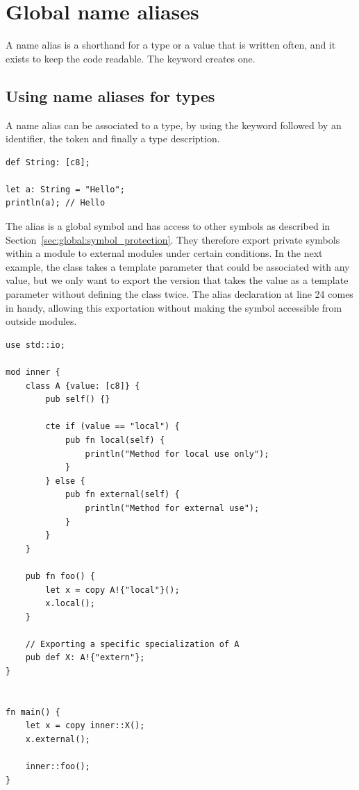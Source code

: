 \section{Global name aliases}
\label{sec:global:global_alias_names}

A name alias is a shorthand for a type or a value that is written often, and it
exists to keep the code readable. The keyword  creates one.

\subsection{Using name aliases for types}

A name alias can be associated to a type, by using the keyword 
followed by an identifier, the token \token{:} and finally a type description.

\begin{lstlisting}[style=coloredverbatim]
def String: [c8];

let a: String = "Hello";
println(a); // Hello
\end{lstlisting}

The alias is a global symbol and has access to other symbols as described in
Section~\ref{sec:global:symbol_protection}. They therefore export
private symbols within a module to external modules under certain conditions. In
the next example, the class  takes a template parameter that could be
associated with any value, but we only want to export the version that takes the
value  as a template parameter without defining the class twice.
The alias declaration  at line 24 comes in handy, allowing this
exportation without making the symbol  accessible from outside modules.

\begin{lstlisting}[style=coloredverbatim]
use std::io;

mod inner {
    class A {value: [c8]} {
        pub self() {}

        cte if (value == "local") {
            pub fn local(self) {
                println("Method for local use only");
            }
        } else {
            pub fn external(self) {
                println("Method for external use");
            }
        }
    }

    pub fn foo() {
        let x = copy A!{"local"}();
        x.local();
    }

    // Exporting a specific specialization of A
    pub def X: A!{"extern"};
}


fn main() {
    let x = copy inner::X();
    x.external();

    inner::foo();
}
\end{lstlisting}

